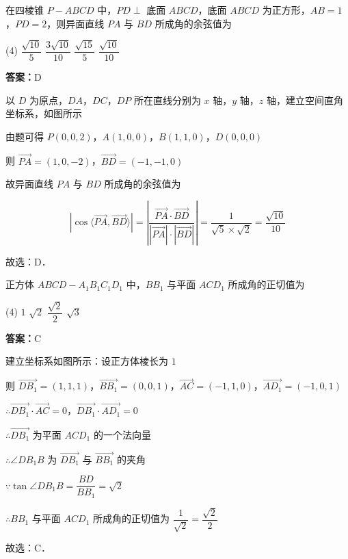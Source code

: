\vspace{2em}

\begin{example}[\bkstar{3}{5}]
在四棱锥 $P-ABCD$ 中，$PD\perp$ 底面 $ABCD$，底面 $ABCD$ 为正方形，$AB=1$，$PD=2$，则异面直线 $PA$ 与 $BD$ 所成角的余弦值为
\begin{tasks}(4)
    \task $\dfrac{\sqrt{10}}{5}$
    \task $\dfrac{3\sqrt{10}}{10}$
    \task $\dfrac{\sqrt{15}}{5}$
    \task $\dfrac{\sqrt{10}}{10}$
\end{tasks}
\end{example}
\begin{solution}
\textbf{答案：}D

以 $D$ 为原点，$DA$，$DC$，$DP$ 所在直线分别为 $x$ 轴，$y$ 轴，$z$ 轴，建立空间直角坐标系，如图所示

由题可得 $P(0,0,2)$，$A(1,0,0)$，$B(1,1,0)$，$D(0,0,0)$

则 $\overrightarrow{PA}=(1,0,-2)$，$\overrightarrow{BD}=(-1,-1,0)$

故异面直线 $PA$ 与 $BD$ 所成角的余弦值为

$$
\left|\cos\langle\overrightarrow{PA},\overrightarrow{BD}\rangle\right|=\left|\dfrac{\overrightarrow{PA}\cdot\overrightarrow{BD}}{\left|\overrightarrow{PA}\right|\cdot\left|\overrightarrow{BD}\right|}\right|=\dfrac{1}{\sqrt{5}\times\sqrt{2}}=\dfrac{\sqrt{10}}{10}
$$

故选：D．
\end{solution}

\vspace{2em}


\begin{example}[\bkstar{2}{5}]
正方体 $ABCD-A_1B_1C_1D_1$ 中，$BB_1$ 与平面 $ACD_1$ 所成角的正切值为
\begin{tasks}(4)
    \task $1$
    \task $\sqrt{2}$
    \task $\dfrac{\sqrt{2}}{2}$
    \task $\sqrt{3}$
\end{tasks}
\end{example}
\begin{solution}
\textbf{答案：}C

建立坐标系如图所示：设正方体棱长为 $1$

则 $\overrightarrow{DB_1}=(1,1,1)$，$\overrightarrow{BB_1}=(0,0,1)$，$\overrightarrow{AC}=(-1,1,0)$，$\overrightarrow{AD_1}=(-1,0,1)$

$\therefore \overrightarrow{DB_1}\cdot\overrightarrow{AC}=0$，$\overrightarrow{DB_1}\cdot\overrightarrow{AD_1}=0$

$\therefore \overrightarrow{DB_1}$ 为平面 $ACD_1$ 的一个法向量

$\therefore \angle DB_1B$ 为 $\overrightarrow{DB_1}$ 与 $\overrightarrow{BB_1}$ 的夹角

$\because \tan\angle DB_1B=\dfrac{BD}{BB_1}=\sqrt{2}$

$\therefore BB_1$ 与平面 $ACD_1$ 所成角的正切值为 $\dfrac{1}{\sqrt{2}}=\dfrac{\sqrt{2}}{2}$

故选：C．
\end{solution}

